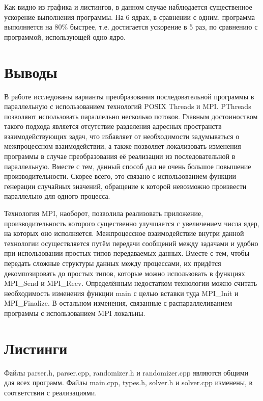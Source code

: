 Как видно из графика и листингов, в данном случае наблюдается существенное ускорение выполнения программы. На 6 ядрах, в сравнении с одним, программа выполняется на 80\% быстрее, т.е. достигается ускорение в 5 раз, по сравнению с программой, использующей одно ядро.


\section{Выводы}

В работе исследованы варианты преобразования последовательной программы в параллельную с использованием технологий POSIX Threads и MPI. PThreads позволяют использовать параллельно несколько потоков. Главным достоиноством такого подхода является отсутствие разделения адресных пространств взаимодействующих задач, что  избавляет от необходимости задумываться о межпроцессном взаимодействии, а также позволяет локализовать изменения программы в случае преобразования её реализации из последовательной в параллельную. Вместе с тем, данный способ дал не очень большое повышение производительности. Скорее всего, это связано с использованием функции генерации случайных значений, обращение к которой невозможно произвести параллельно для одного процесса.

Технология MPI, наоборот, позволила реализовать приложение, производительность которого существенно улучшается с увеличением числа ядер, на которых оно исполняется. Межпроцессное взаимодействие внутри данной технологии осуществляется путём передачи сообщений между задачами и удобно при использовании простых типов передаваемых данных. Вместе с тем, чтобы передать сложные структуры данных между процессами, их придётся декомпозировать до простых типов, которые можно использовать в функциях MPI\_Send и MPI\_Recv. Определённым недостатком технологии можно считать необходимость изменения функции main с целью вставки туда MPI\_Init и MPI\_Finalize. В остальном изменения, связанные с распараллеливанием программы с использованием MPI локальны.


\section{Листинги}

Файлы parser.h, parser.cpp, randomizer.h и randomizer.cpp являются общими для всех программ. Файлы main.cpp, types.h, solver.h и solver.cpp изменены, в соответствии с реализациями.

